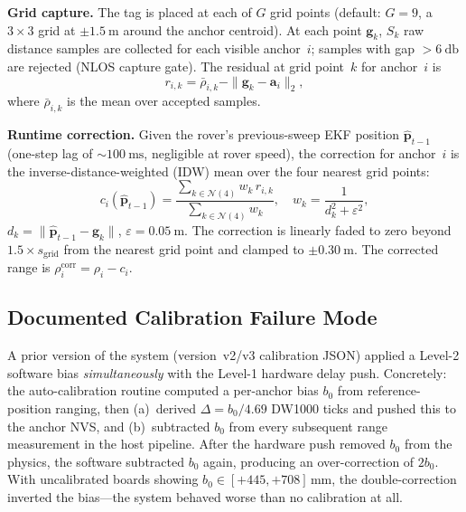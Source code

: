 \textbf{Grid capture.}
The tag is placed at each of $G$ grid points (default: $G = 9$, a
$3 \times 3$ grid at $\pm\SI{1.5}{\metre}$ around the anchor centroid).
At each point $\mathbf{g}_k$, $S_k$ raw distance samples are collected for
each visible anchor~$i$; samples with gap $> \SI{6}{\decibel}$ are
rejected (NLOS capture gate).
The residual at grid point~$k$ for anchor~$i$ is
\begin{equation}
  r_{i,k} = \bar{\rho}_{i,k} - \|\mathbf{g}_k - \mathbf{a}_i\|_2,
  \label{eq:errormap_residual}
\end{equation}
where $\bar{\rho}_{i,k}$ is the mean over accepted samples.

\textbf{Runtime correction.}
Given the rover's previous-sweep EKF position $\hat{\mathbf{p}}_{t-1}$
(one-step lag of $\sim\SI{100}{\milli\second}$, negligible at rover speed),
the correction for anchor~$i$ is the inverse-distance-weighted (IDW) mean
over the four nearest grid points:
\begin{equation}
  c_i(\hat{\mathbf{p}}_{t-1}) =
  \frac{\displaystyle\sum_{k \in \mathcal{N}(4)} w_k\,r_{i,k}}
       {\displaystyle\sum_{k \in \mathcal{N}(4)} w_k},
  \quad w_k = \frac{1}{d_k^2 + \varepsilon^2},
  \label{eq:idw}
\end{equation}
$d_k = \|\hat{\mathbf{p}}_{t-1} - \mathbf{g}_k\|$, $\varepsilon = \SI{0.05}{\metre}$.
The correction is linearly faded to zero beyond $1.5 \times s_{\text{grid}}$
from the nearest grid point and clamped to $\pm\SI{0.30}{\metre}$.
The corrected range is $\rho_i^{\text{corr}} = \rho_i - c_i$.

\subsection{Documented Calibration Failure Mode}
\label{sec:failure_mode}

A prior version of the system (version~v2/v3 calibration JSON) applied a
Level-2 software bias \emph{simultaneously} with the Level-1 hardware delay
push.
Concretely: the auto-calibration routine computed a per-anchor bias $b_0$
from reference-position ranging, then (a)~derived $\Delta = b_0/4.69$
DW1000 ticks and pushed this to the anchor NVS, and (b)~subtracted $b_0$
from every subsequent range measurement in the host pipeline.
After the hardware push removed $b_0$ from the physics, the software
subtracted $b_0$ again, producing an over-correction of $2 b_0$.
With uncalibrated boards showing $b_0 \in [+445, +708]$\,mm, the
double-correction inverted the bias---the system behaved worse than no
calibration at all.

